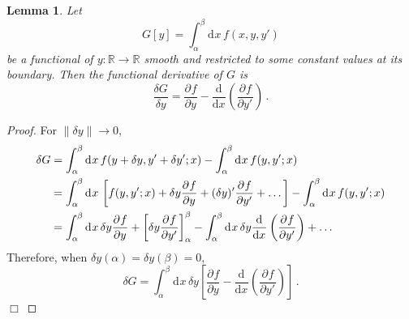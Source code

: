 \documentclass{article}
\theoremstyle{plain}\theoremheaderfont{\normalfont\itshape}\theorembodyfont{\rmfamily}\theoremseparator{.}\newtheorem*{rem}{Remark}\newtheorem*{ex}{Example}\newtheorem*{proof}{Proof}\newtheorem*{altp}{Alternative proof}
\theoremstyle{plain}\theoremheaderfont{\normalfont\bfseries}\theorembodyfont{\rmfamily}\theoremseparator{.}\newtheorem{thm}{Theorem}[section]\newtheorem{lem}[thm]{Lemma}\newtheorem{prop}[thm]{Proposition}\newtheorem*{cor}{Corollary}\newtheorem{defn}[thm]{Definition}\newtheorem{clm}[thm]{Claim}\newtheorem{clminproof}{Claim}
\theoremstyle{break}\theoremheaderfont{\normalfont\itshape}\theorembodyfont{\rmfamily}\theoremseparator{.\medskip}\newtheorem*{proofskip}{Proof}\newtheorem*{exs}{Examples}\newtheorem*{rems}{Remarks}
\theoremstyle{break}\theoremheaderfont{\normalfont\bfseries}\theorembodyfont{\rmfamily}\theoremseparator{.\medskip}\newtheorem{lemskip}[thm]{Lemma}\newtheorem{defnskip}[thm]{Definition}\newtheorem{propskip}[thm]{Proposition}\newtheorem{thmskip}[thm]{Theorem}
\numberwithin{equation}{section}
\newcommand{\qed}{\hfill\ensuremath{\Box}}
\newcommand{\dd}[2][]{\mathrm{d}^{#1} #2\,}
\newcommand{\dv}[3][]{\frac{\mathrm{d}^{#1} #2}{{\mathrm{d} #3}^{#1}}}
\newcommand{\pdv}[3][]{\frac{\partial^{#1} #2}{{\partial #3}^{#1}}}
\newcommand{\norm}[1]{\left\| #1 \right\|}
\begin{document}
    \begin{lem}
        Let
        \begin{equation}
            G[y]=\int_{\alpha}^{\beta}\dd{x}f(x,y,y')
        \end{equation}
        be a functional of \(y:\mathbb{R}\to\mathbb{R}\) smooth and restricted to some constant values at its boundary. Then the functional derivative of \(G\) is
        \begin{equation}
            \frac{\delta G}{\delta y}=\pdv{f}{y}-\dv{}{x}\left(\pdv{f}{y'}\right)\,.
        \end{equation}
    \end{lem}
    \begin{proof}
        For \(\norm{\delta y}\to 0\),
        \begin{align}
            \delta G&=\int_{\alpha}^{\beta}\dd{x}f(y+\delta y,y'+\delta y';x)-\int_{\alpha}^{\beta}\dd{x}f(y,y';x)\notag\\
            &=\int_{\alpha}^{\beta}\dd{x}\left[f(y,y';x)+\delta y\pdv{f}{y}+(\delta y)'\pdv{f}{y'}+\dots\right]-\int_{\alpha}^{\beta}\dd{x}f(y,y';x)\notag\\
            &=\int_{\alpha}^{\beta}\dd{x}\delta y\pdv{f}{y}+\left[\delta y\pdv{f}{y'}\right]_\alpha^\beta-\int_{\alpha}^{\beta}\dd{x}\delta y\dv{}{x}\left(\pdv{f}{y'}\right)+\dots
        \end{align}
        Therefore, when \(\delta y(\alpha)=\delta y(\beta)=0\),
        \begin{equation}
            \delta G=\int_{\alpha}^{\beta}\dd{x}\delta y\left[\pdv{f}{y}-\dv{}{x}\left(\pdv{f}{y'}\right)\right]\,.
        \end{equation}\qed
    \end{proof}
\end{document}
